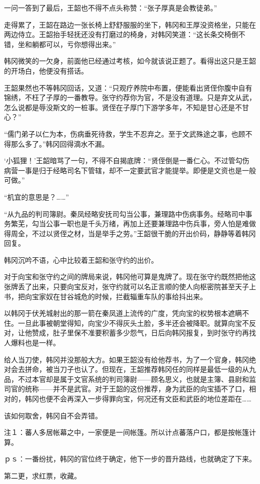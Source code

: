 一问一答到了最后，王韶也不得不点头称赞：“张子厚真是会教徒弟。”

走得累了，王韶在路边一张长椅上舒舒服服的坐下，韩冈和王厚没资格坐，只能在两边侍立。王韶抬手轻抚还没有打磨过的椅身，对韩冈笑道：“这长条交椅倒不错，坐和躺都可以，亏你想得出来。”

韩冈微笑的一欠身，前面他已经通过考核，如今就该说正题了。看得出这只是王韶的开场白，他便没有搭话。

王韶果然也不等韩冈回话，又道：“只观疗养院中布置，便能看出贤侄你腹中自有锦绣，不枉了子厚的一番教导。张守约荐你为官，不是没有道理。只是弃文从武，怎么说都是辱没斯文的一桩事。贤侄在子厚门下游学多年，不知是甘心还是不甘心？”

“儒门弟子以仁为本，伤病垂死待救，学生不忍弃之。至于文武殊途之事，也顾不得那么多了。”韩冈回得滴水不漏。

‘小狐狸！’王韶暗骂了一句，不得不自揭底牌：“贤侄倒是一番仁心。不过管勾伤病营一事是归于经略司名下管辖，却不一定要武官才能提举。即便是文资也是一般可做。”

“机宜的意思是？……”

“从九品的判司簿尉。秦凤经略安抚司勾当公事，兼理路中伤病事务。经略司中事务繁芜，勾当公事一职也是千头万绪，再加上还要兼理路中伤兵事，旁人怕是难做得周全，不过以贤侄之材，当是举手之劳。”王韶很干脆的开出价码，静静等着韩冈回复。

韩冈沉吟不语，心中比较着王韶和张守约的出价。

对于向宝和张守约之间的牌局来说，韩冈他可算是鬼牌了。现在张守约既然把他这张牌丢了出来，只要向宝反对，张守约就可以名正言顺的使人向枢密院甚至天子上书，把向宝家奴在甘谷城危的时候，拦截辎重车队的事给抖出来。

以韩冈于伏羌城射出的那一箭在秦凤道上流传的广度，凭向宝的权势根本遮瞒不住。一旦此事被朝堂得知，向宝少不得灰头土脸，多半还会被降职。就算向宝不反对，让他赞成，肚子里保不准要积蓄多少怨气，日后向韩冈报复，到时张守约再找人爆料也是一样。

给人当刀使，韩冈并没那般大方。如果王韶没有给他荐书，为了一个官身，韩冈绝对会去拼命，被当刀子也认了。但现在，王韶推荐韩冈任的同样是最低一级的从九品，不过本官却是属于文官系统的判司簿尉——顾名思义，也就是主簿、县尉和监司官的统称——并不是武官。对于王韶的这份推荐，身为武臣的向宝插不了口，相对的，韩冈也便不会再深入一步得罪向宝，何况还有文臣和武臣的地位差距在……

该如何取舍，韩冈自不会弄错。

注１：蕃人多居帐幕之中，一家便是一间帐篷。所以计点蕃落户口，都是按帐篷计算。

ｐｓ：一番纷扰，韩冈的官位终于确定，他下一步的晋升路线，也就确定了下来。

第二更，求红票，收藏。

